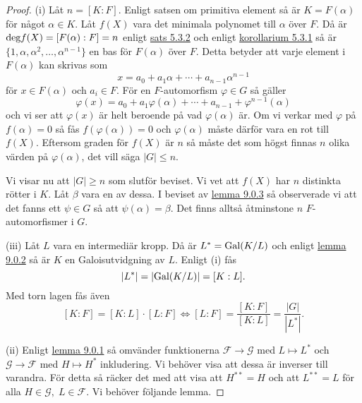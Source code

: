 \documentclass{article}
\newcommand{\grad}[0]{\textnormal{deg}}
\newcommand{\gal}[0]{\textnormal{Gal}}
\theoremstyle{definition}
\begin{document}
\begin{proof}
  (i) Låt $n = [K:F]$. Enligt satsen om primitiva element så är $K = F(\alpha)$ för något $\alpha \in K.$ Låt $f(X)$ vara det minimala polynomet 
  till $\alpha$ över $F$. Då är $\grad f(X) = [F(\alpha):F] = n$ enligt \hyperlink{5.3.2}{sats 5.3.2} och enligt \hyperlink{kol5.3.1}{korollarium 5.3.1} så är 
  $\{1, \alpha, \alpha^2, \ldots, \alpha^{n-1}\}$ en bas för $F(\alpha)$ över $F$. Detta betyder att varje element i 
  $F(\alpha)$ kan skrivas som 
  \[ x = a_0 + a_1 \alpha + \cdots + a_{n-1} \alpha^{n-1}\]
  för $x \in F(\alpha)$ och $a_i \in F$. För en $F$-automorfism $\varphi \in G$ så gäller 
  \[ \varphi(x) = a_0 + a_1 \varphi(\alpha) + \cdots + a_{n-1} + \varphi^{n-1}(\alpha)\]
  och vi ser att $\varphi(x)$ är helt beroende på vad $\varphi(\alpha)$ är. Om vi 
  verkar med $\varphi$ på $f(\alpha) = 0$ så fås $f(\varphi(\alpha)) = 0$ och $\varphi(\alpha)$ måste därför vara en rot till $f(X)$.
  Eftersom graden för $f(X)$ är $n$ så måste det som högst finnas $n$ olika värden på $\varphi(\alpha)$, det vill säga
  $|G| \leq n$.

  Vi visar nu att $|G| \geq n$ som slutför beviset. Vi vet att $f(X)$ har $n$ distinkta rötter i $K$. Låt $\beta$ vara en av dessa.
  I beviset av \hyperlink{lemma9.0.3}{lemma 9.0.3} så observerade vi att det fanns ett $\psi \in G$ så att $\psi(\alpha) = \beta.$
  Det finns alltså åtminstone $n$ $F$-automorfismer i $G$. 

  (iii) Låt $L$ vara en intermediär kropp. Då är $L^* = \gal(K/L)$ och enligt \hyperlink{lemma9.0.2}{lemma 9.0.2} så är $K$ en Galoisutvidgning av $L$.
  Enligt (i) fås 
  \[|L^*| = |\gal(K/L)| = [K:L]. \]
  Med torn lagen fås även
  \[ [K:F] = [K:L] \cdot [L:F] \iff [L:F] = \frac{ [K:F] }{ [K:L] } = \frac{|G|}{|L^*|}. \]

  (ii) Enligt \hyperlink{lemma9.0.1}{lemma 9.0.1} så omvänder funktionerna $\mathcal{F} \rightarrow \mathcal{G}$ med $L \mapsto L^*$ och
  $\mathcal{G} \rightarrow \mathcal{F}$ med $H \mapsto H^*$ inkludering. Vi behöver visa att dessa är inverser till varandra.
  För detta så räcker det med att visa att $H^{**} = H$ och att $L^{**} = L$ för alla $H \in \mathcal{G}, \; L \in \mathcal{F}$.
  Vi behöver följande lemma.


\end{proof}
\end{document}
